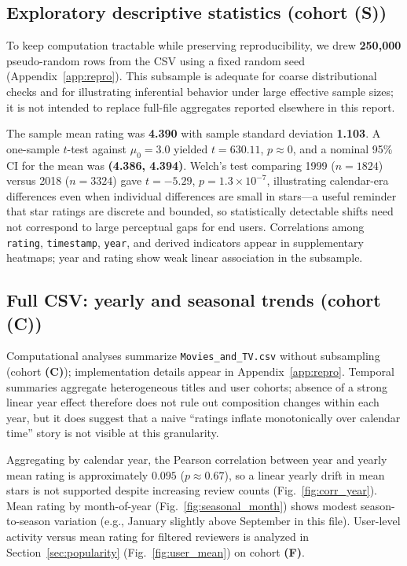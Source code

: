 \documentclass[conference]{IEEEtran}
\begin{document}
\subsection{Exploratory descriptive statistics (cohort \textbf{(S)})}
To keep computation tractable while preserving reproducibility, we drew \textbf{250{,}000} pseudo-random rows from the CSV using a fixed random seed (Appendix~\ref{app:repro}). This subsample is adequate for coarse distributional checks and for illustrating inferential behavior under large effective sample sizes; it is not intended to replace full-file aggregates reported elsewhere in this report.

The sample mean rating was \textbf{4.390} with sample standard deviation \textbf{1.103}. A one-sample $t$-test against $\mu_0=3.0$ yielded $t=630.11$, $p\approx 0$, and a nominal 95\% CI for the mean was \textbf{(4.386, 4.394)}. Welch's test comparing 1999 ($n=1824$) versus 2018 ($n=3324$) gave $t=-5.29$, $p=1.3\times 10^{-7}$, illustrating calendar-era differences even when individual differences are small in stars---a useful reminder that star ratings are discrete and bounded, so statistically detectable shifts need not correspond to large perceptual gaps for end users. Correlations among \texttt{rating}, \texttt{timestamp}, \texttt{year}, and derived indicators appear in supplementary heatmaps; year and rating show weak linear association in the subsample.

\subsection{Full CSV: yearly and seasonal trends (cohort \textbf{(C)})}
Computational analyses summarize \texttt{Movies\_and\_TV.csv} without subsampling (cohort \textbf{(C)}); implementation details appear in Appendix~\ref{app:repro}. Temporal summaries aggregate heterogeneous titles and user cohorts; absence of a strong linear year effect therefore does not rule out composition changes within each year, but it does suggest that a naive ``ratings inflate monotonically over calendar time'' story is not visible at this granularity.

Aggregating by calendar year, the Pearson correlation between year and yearly mean rating is approximately $0.095$ ($p \approx 0.67$), so a linear yearly drift in mean stars is not supported despite increasing review counts (Fig.~\ref{fig:corr_year}). Mean rating by month-of-year (Fig.~\ref{fig:seasonal_month}) shows modest season-to-season variation (e.g., January slightly above September in this file). User-level activity versus mean rating for filtered reviewers is analyzed in Section~\ref{sec:popularity} (Fig.~\ref{fig:user_mean}) on cohort \textbf{(F)}.
\end{document}
